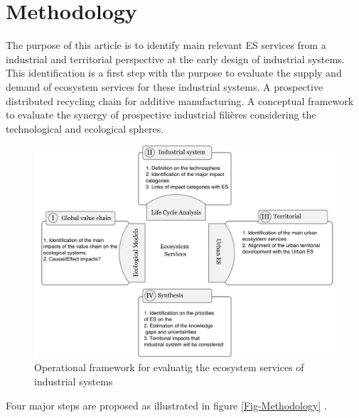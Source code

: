 \documentclass[]{elsarticle} %
\begin{document}
\hypertarget{methodology}{%
\section{Methodology}\label{methodology}}

\label{methodology}

The purpose of this article is to identify main relevant ES services from a industrial and territorial perspective at the early design of industrial systems.
This identification is a first step with the purpose to evaluate the supply and demand of ecosystem services for these industrial systems.
A prospective distributed recycling chain for additive manufacturing.
A conceptual framework to evaluate the synergy of prospective industrial filières considering the technological and ecological spheres.

\begin{figure}[!ht]

{\centering \includegraphics[width=1\linewidth]{Figures/Methodology} 

}

\caption{Operational framework for evaluatig the ecosystem services of industrial systems}\label{fig:Fig-Methodology}
\end{figure}

Four major steps are proposed as illustrated in figure \ref{Fig-Methodology} .
\end{document}
